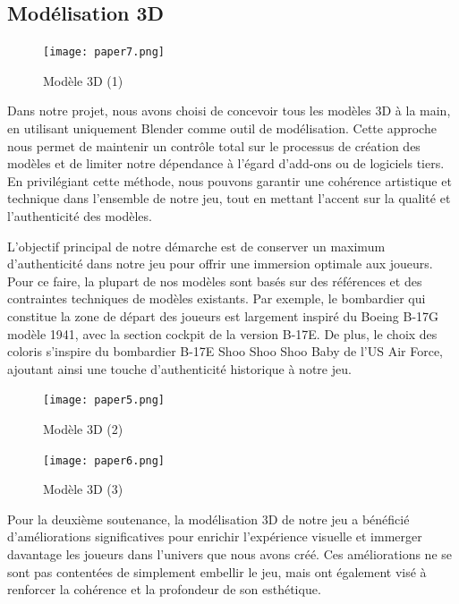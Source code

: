 \documentclass[
	article,			%
	11pt,				%
	oneside,			%
	a4paper,			%
	chapter=TITLE,
	french,			%
	sumario=tradicional
	]{base_nt}
\begin{document}
\subsection{Modélisation 3D}

\begin{figure}[ht]
	\caption{Modèle 3D (1)}
	\centering
	\texttt{[image: paper7.png]}
	\legend{}
	
\end{figure}

Dans notre projet, nous avons choisi de concevoir tous les modèles 3D à la main, en utilisant uniquement Blender comme outil de modélisation. Cette approche nous permet de maintenir un contrôle total sur le processus de création des modèles et de limiter notre dépendance à l'égard d'add-ons ou de logiciels tiers. En privilégiant cette méthode, nous pouvons garantir une cohérence artistique et technique dans l'ensemble de notre jeu, tout en mettant l'accent sur la qualité et l'authenticité des modèles.

L'objectif principal de notre démarche est de conserver un maximum d'authenticité dans notre jeu pour offrir une immersion optimale aux joueurs. Pour ce faire, la plupart de nos modèles sont basés sur des références et des contraintes techniques de modèles existants. Par exemple, le bombardier qui constitue la zone de départ des joueurs est largement inspiré du Boeing B-17G modèle 1941, avec la section cockpit de la version B-17E. De plus, le choix des coloris s'inspire du bombardier B-17E Shoo Shoo Shoo Baby de l'US Air Force, ajoutant ainsi une touche d'authenticité historique à notre jeu.

\begin{figure}[ht]
	\caption{Modèle 3D (2)}
	\centering
	\texttt{[image: paper5.png]}
	\legend{}
	
\end{figure}
\begin{figure}[ht]
	\caption{Modèle 3D (3)}
	\centering
	\texttt{[image: paper6.png]}
	\legend{}
	
\end{figure}

\newpage

Pour la deuxième soutenance, la modélisation 3D de notre jeu a bénéficié d'améliorations significatives pour enrichir l'expérience visuelle et immerger davantage les joueurs dans l'univers que nous avons créé. Ces améliorations ne se sont pas contentées de simplement embellir le jeu, mais ont également visé à renforcer la cohérence et la profondeur de son esthétique.
\end{document}
